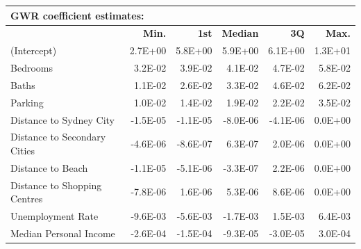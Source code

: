 \renewcommand{\baselinestretch}{0.8}
\begin{table}[htbp]
  \centering \small
    \begin{tabular}{llllll}
    \multicolumn{6}{l}{\textbf{GWR coefficient estimates:}} \\
    \midrule
          & \multicolumn{1}{r}{\textbf{Min.}} & \multicolumn{1}{r}{\textbf{1st}} & \multicolumn{1}{r}{\textbf{Median}} & \multicolumn{1}{r}{\textbf{3Q}} & \multicolumn{1}{r}{\textbf{Max.}} \\
    (Intercept) & \multicolumn{1}{r}{2.7E+00} & \multicolumn{1}{r}{5.8E+00} & \multicolumn{1}{r}{5.9E+00} & \multicolumn{1}{r}{6.1E+00} & \multicolumn{1}{r}{1.3E+01} \\
    Bedrooms & \multicolumn{1}{r}{3.2E-02} & \multicolumn{1}{r}{3.9E-02} & \multicolumn{1}{r}{4.1E-02} & \multicolumn{1}{r}{4.7E-02} & \multicolumn{1}{r}{5.8E-02} \\
    Baths & \multicolumn{1}{r}{1.1E-02} & \multicolumn{1}{r}{2.6E-02} & \multicolumn{1}{r}{3.3E-02} & \multicolumn{1}{r}{4.6E-02} & \multicolumn{1}{r}{6.2E-02} \\
    Parking & \multicolumn{1}{r}{1.0E-02} & \multicolumn{1}{r}{1.4E-02} & \multicolumn{1}{r}{1.9E-02} & \multicolumn{1}{r}{2.2E-02} & \multicolumn{1}{r}{3.5E-02} \\
    Distance to Sydney City & \multicolumn{1}{r}{-1.5E-05} & \multicolumn{1}{r}{-1.1E-05} & \multicolumn{1}{r}{-8.0E-06} & \multicolumn{1}{r}{-4.1E-06} & \multicolumn{1}{r}{0.0E+00} \\
    Distance to Secondary Cities & \multicolumn{1}{r}{-4.6E-06} & \multicolumn{1}{r}{-8.6E-07} & \multicolumn{1}{r}{6.3E-07} & \multicolumn{1}{r}{2.0E-06} & \multicolumn{1}{r}{0.0E+00} \\
    Distance to Beach & \multicolumn{1}{r}{-1.1E-05} & \multicolumn{1}{r}{-5.1E-06} & \multicolumn{1}{r}{-3.3E-07} & \multicolumn{1}{r}{2.2E-06} & \multicolumn{1}{r}{0.0E+00} \\
    Distance to Shopping Centres & \multicolumn{1}{r}{-7.8E-06} & \multicolumn{1}{r}{1.6E-06} & \multicolumn{1}{r}{5.3E-06} & \multicolumn{1}{r}{8.6E-06} & \multicolumn{1}{r}{0.0E+00} \\
    Unemployment Rate & \multicolumn{1}{r}{-9.6E-03} & \multicolumn{1}{r}{-5.6E-03} & \multicolumn{1}{r}{-1.7E-03} & \multicolumn{1}{r}{1.5E-03} & \multicolumn{1}{r}{6.4E-03} \\
    Median Personal Income & \multicolumn{1}{r}{-2.6E-04} & \multicolumn{1}{r}{-1.5E-04} & \multicolumn{1}{r}{-9.3E-05} & \multicolumn{1}{r}{-3.0E-05} & \multicolumn{1}{r}{3.0E-04} \\

\end{tabular}
\end{table}
